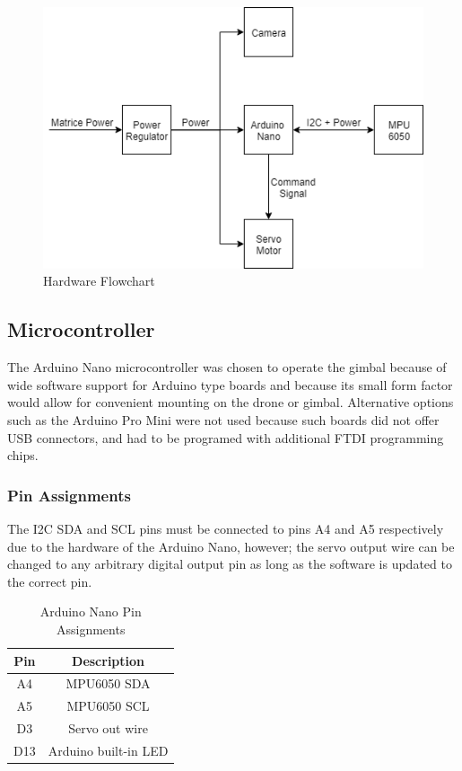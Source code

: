 \documentclass[11pt]{article} %
\begin{document}
\begin{figure}[H]
\begin{centering}
\includegraphics[height = 0.5\textwidth]{Pictures/hardware_flowchart.png}
\caption{Hardware Flowchart}
\label{fig:hardware}
\end{centering}
\end{figure}

\subsection{Microcontroller}
The Arduino Nano microcontroller was chosen to operate the gimbal because of wide software support for Arduino type boards and because its small form factor would allow for convenient mounting on the drone or gimbal. Alternative options such as the Arduino Pro Mini were not used because such boards did not offer USB connectors, and had to be programed with additional FTDI programming chips. 

\subsubsection{Pin Assignments}
The I2C SDA and SCL pins must be connected to pins A4 and A5 respectively due to the hardware of the Arduino Nano, however; the servo output wire can be changed to any arbitrary digital output pin as long as the software is updated to the correct pin.
\begin{table}[H]
	\begin{center}
		\begin{tabular}[l]{|c|c|}
			\hline
			\textbf{Pin} & \textbf{Description} \\ \hline \hline
			A4 & MPU6050 SDA  \\ \hline
			A5 & MPU6050 SCL   \\ \hline
			D3 & Servo out wire  \\ \hline
			D13 & Arduino built-in LED \\ \hline
			
		\end{tabular}
		\caption{Arduino Nano Pin Assignments}
		\label{tab:nano_pins}
	\end{center}
\end{table}
\end{document}
